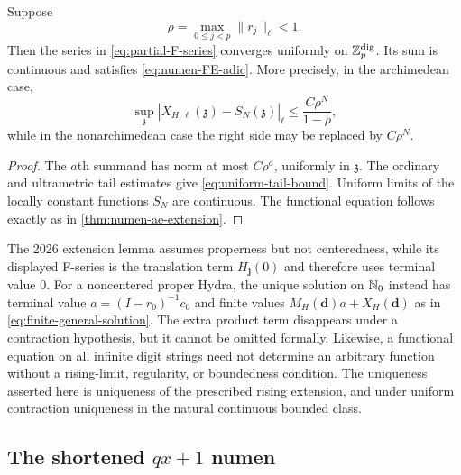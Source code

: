 \begin{theorem}
\label{thm:numen-uniform-contraction}
Suppose
\[
 \rho=\max_{0\leq j<p}\|r_j\|_\ell<1.
\]
Then the series in \cref{eq:partial-F-series} converges uniformly on
$\mathbb Z_p^{\mathrm{dig}}$.  Its sum is continuous and satisfies
\cref{eq:numen-FE-adic}.  More precisely, in the archimedean case,
\begin{equation}
\label{eq:uniform-tail-bound}
 \sup_{\mathfrak z}|X_{H,\ell}(\mathfrak z)-S_N(\mathfrak z)|_\ell
 \leq \frac{C\rho^N}{1-\rho},
\end{equation}
while in the nonarchimedean case the right side may be replaced by
$C\rho^N$.
\end{theorem}

\begin{proof}
The $a$th summand has norm at most $C\rho^a$, uniformly in
$\mathfrak z$.  The ordinary and ultrametric tail estimates give
\cref{eq:uniform-tail-bound}.  Uniform limits of the locally constant
functions $S_N$ are continuous.  The functional equation follows exactly as
in \cref{thm:numen-ae-extension}.
\end{proof}

\begin{sourceissue}
The 2026 extension lemma assumes properness but not centeredness, while its
displayed F-series is the translation term $H_{\mathbf j}(0)$ and therefore
uses terminal value $0$.  For a noncentered proper Hydra, the unique solution
on $\mathbb N_0$ instead has terminal value
$a=(I-r_0)^{-1}c_0$ and finite values
$M_H(\mathbf d)a+X_H(\mathbf d)$ as in
\cref{eq:finite-general-solution}.  The extra product term disappears under
a contraction hypothesis, but it cannot be omitted formally.  Likewise, a
functional equation on all infinite digit strings need not determine an
arbitrary function without a rising-limit, regularity, or boundedness
condition.  The uniqueness asserted here is uniqueness of the prescribed
rising extension, and under uniform contraction uniqueness in the natural
continuous bounded class.
\end{sourceissue}

\subsection{The shortened \texorpdfstring{$qx+1$}{qx+1} numen}

